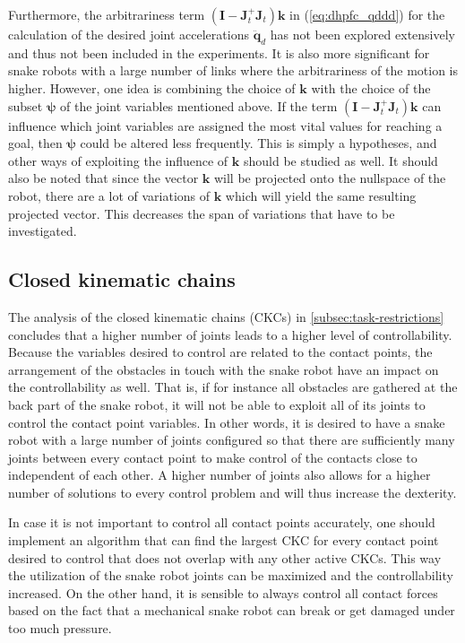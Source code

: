 Furthermore, the arbitrariness term $(\mathbf{I}-  \mathbf{J}_t^+ \mathbf{J}_t)\mathbf{k}$ in (\ref{eq:dhpfc_qddd}) for the calculation of the desired joint accelerations $\ddot{\mathbf{q}}_d$ has not been explored extensively and thus not been included in the experiments. It is also more significant for snake robots with a large number of links where the arbitrariness of the motion is higher. However, one idea is combining the choice of $\mathbf{k}$ with the choice of the subset $\boldsymbol{\psi}$ of the joint variables mentioned above. If the term $(\mathbf{I}-  \mathbf{J}_t^+ \mathbf{J}_t)\mathbf{k}$ can influence which joint variables are assigned the most vital values for reaching a goal, then $\boldsymbol{\psi}$ could be altered less frequently. This is simply a hypotheses, and other ways of exploiting the influence of $\mathbf{k}$ should be studied as well. It should also be noted that since the vector $\mathbf{k}$ will be projected onto the nullspace of the robot, there are a lot of variations of $\mathbf{k}$ which will yield the same resulting projected vector. This decreases the span of variations that have to be investigated.

\subsection{Closed kinematic chains}

The analysis of the closed kinematic chains (CKCs) in \ref{subsec:task-restrictions} concludes that a higher number of joints leads to a higher level of controllability. Because the variables desired to control are related to the contact points, the arrangement of the obstacles in touch with the snake robot have an impact on the controllability as well. That is, if for instance all obstacles are gathered at the back part of the snake robot, it will not be able to exploit all of its joints to control the contact point variables. In other words, it is desired to have a snake robot with a large number of joints configured so that there are sufficiently many joints between every contact point to make control of the contacts close to independent of each other. A higher number of joints also allows for a higher number of solutions to every control problem and will thus increase the dexterity.

In case it is not important to control all contact points accurately, one should implement an algorithm that can find the largest CKC for every contact point desired to control that does not overlap with any other active CKCs. This way the utilization of the snake robot joints can be maximized and the controllability increased. On the other hand, it is sensible to always control all contact forces based on the fact that a mechanical snake robot can break or get damaged under too much pressure.

